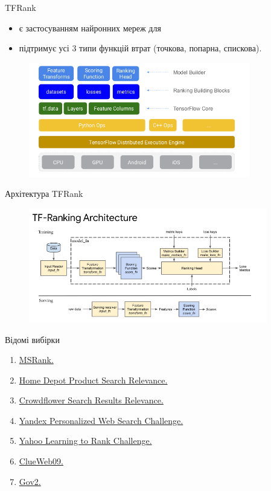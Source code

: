 \documentclass[10pt]{beamer}
\begin{document}
\begin{frame}{TFRank}
\begin{itemize}
\item є застосуванням найронних мереж для 
\item підтримує усі 3 типи функцій втрат (точкова, попарна, спискова).
\end{itemize}
\begin{figure}
    \includegraphics[height=5cm]{images/tfrank-architecture.png}
\end{figure}
\end{frame}

\begin{frame}{Архітектура TFRank}
\begin{figure}
    \includegraphics[height=5cm]{images/tfrank-architecture2.png}
\end{figure}
\end{frame}


\begin{frame}{Відомі вибірки}
\begin{enumerate}
    \item \href{https://www.microsoft.com/en-us/research/project/mslr/}{MSRank.}
    \item \href{https://www.kaggle.com/c/home-depot-product-search-relevance}{Home Depot Product Search Relevance.}
    \item \href{https://www.kaggle.com/c/crowdflower-search-relevance/data}{Crowdflower Search Results Relevance.}
    \item \href{https://www.kaggle.com/c/yandex-personalized-web-search-challenge}{Yandex Personalized Web Search Challenge.}
    \item \href{https://webscope.sandbox.yahoo.com/catalog.php?datatype=c}{Yahoo Learning to Rank Challenge.}
    \item \href{https://lemurproject.org/clueweb09.php/}{ClueWeb09.}
    \item \href{http://ir.dcs.gla.ac.uk/test_collections/access_to_data.html}{Gov2.}
\end{enumerate}
\end{frame}
\end{document}

